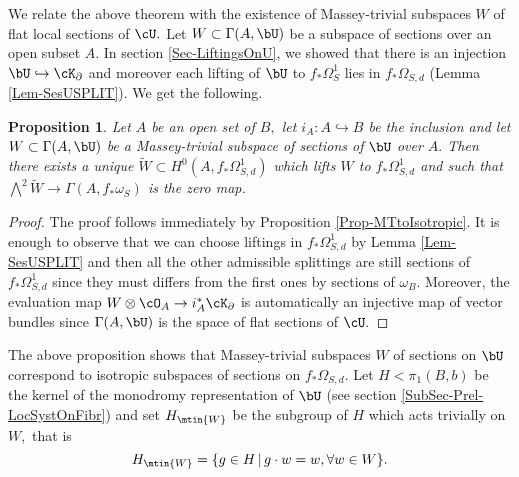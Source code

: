 \documentclass[a4paper,11pt]{amsart}
\newtheorem{proposition}[theorem]{Proposition}
\begin{document}
{ 				We relate the above theorem with the existence of Massey-trivial subspaces $W$ of flat local sections of $\cU.$
 				Let $W\subset \Gamma(A, \bU)$ be a subspace of sections over an open subset $A$. In section \ref{Sec-LiftingsOnU}, we showed that there is an injection $\bU\hookrightarrow \cK_\partial$ and moreover each lifting of $\bU$ to  $f_*\Omega^1_S$ lies in $f_*\Omega_{S,d}$ (Lemma \ref{Lem-SesUSPLIT}). We get the following.
 				\begin{proposition} \label{Prop-UMTtoIsotropic} Let $A$ be an open set of $B,$ let $i_A: A\hookrightarrow B$ be the inclusion and let $W\subset \Gamma(A,\bU)$ be a Massey-trivial subspace of sections of $\bU$ over $A.$ Then there exists a unique $\widetilde{W}\subset H^0(A,f_*\Omega^1_{S,d})$ which lifts $W$ to $f_\ast\Omega^1_{S,d}$ and such that    $\bigwedge ^2\widetilde{W}\to \Gamma(A, f_\ast \omega_S)$ is the  zero map. 					%
 				\end{proposition}	
 				\begin{proof} The proof follows immediately by Proposition \ref{Prop-MTtoIsotropic}. It is enough to observe that we can choose liftings in $f_*\Omega^1_{S,d}$ by Lemma \ref{Lem-SesUSPLIT} and then all the other admissible splittings are still sections of $f_*\Omega^1_{S,d}$ since they must differs from the first ones by sections of $\omega_B.$ Moreover, the evaluation map $W\otimes \cO_A\to i_A^*\cK_\partial$ is automatically an injective map of vector bundles since $\Gamma(A,\bU)$ is the space of flat sections of $\cU.$
 					\end{proof}
 					The above proposition shows that Massey-trivial subspaces $W$ of sections on $\bU$ correspond to isotropic subspaces of sections on $f_\ast\Omega_{S,d}.$ Let $H<\pi_1(B,b)$ be the kernel of the monodromy representation of $\bU$ (see section \ref{SubSec-Prel-LocSystOnFibr}) and set $H_{\mtin{W}}$ be the subgroup of $H$ which acts trivially on $W,$ that is 
 					\begin{equation}
 					H_{\mtin{W}}=\{g\in H\, |  \, g\cdot w= w, \forall w\in W\}.
 					\end{equation}
 					
}
\end{document}
